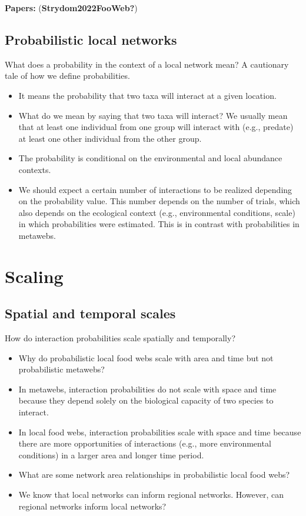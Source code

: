 \documentclass[10pt,oneside]{article}
\begin{document}
\textbf{Papers:} (\textbf{Strydom2022FooWeb?})

\hypertarget{probabilistic-local-networks}{%
\subsection{Probabilistic local
networks}\label{probabilistic-local-networks}}

What does a probability in the context of a local network mean? A
cautionary tale of how we define probabilities.

\begin{itemize}
\tightlist
\item
  It means the probability that two taxa will interact at a given
  location.
\item
  What do we mean by saying that two taxa will interact? We usually mean
  that at least one individual from one group will interact with (e.g.,
  predate) at least one other individual from the other group.
\item
  The probability is conditional on the environmental and local
  abundance contexts.
\item
  We should expect a certain number of interactions to be realized
  depending on the probability value. This number depends on the number
  of trials, which also depends on the ecological context (e.g.,
  environmental conditions, scale) in which probabilities were
  estimated. This is in contrast with probabilities in metawebs.
\end{itemize}

\hypertarget{scaling}{%
\section{Scaling}\label{scaling}}

\hypertarget{spatial-and-temporal-scales}{%
\subsection{Spatial and temporal
scales}\label{spatial-and-temporal-scales}}

How do interaction probabilities scale spatially and temporally?

\begin{itemize}
\tightlist
\item
  Why do probabilistic local food webs scale with area and time but not
  probabilistic metawebs?
\item
  In metawebs, interaction probabilities do not scale with space and
  time because they depend solely on the biological capacity of two
  species to interact.
\item
  In local food webs, interaction probabilities scale with space and
  time because there are more opportunities of interactions (e.g., more
  environmental conditions) in a larger area and longer time period.
\item
  What are some network area relationships in probabilistic local food
  webs?
\item
  We know that local networks can inform regional networks. However, can
  regional networks inform local networks?
\end{itemize}
\end{document}
